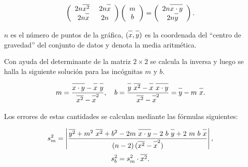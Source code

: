 \documentclass[10pd,hyperref={colorlinks=true}]{beamer}
\begin{document}
\begin{frame}{}

$$
\left(\begin{array}{cc}
2n\overline{\mathstrut x^2}\ & 2n\overline{\mathstrut x} \\
2n\overline{\mathstrut x} & 2n
\end{array}\right)
\left(\begin{array}{c}
m \\
b
\end{array}\right) =
\left(\begin{array}{c}
2n\overline{\mathstrut x\cdot y} \\
2n\overline{\mathstrut y}
\end{array}\right).
$$

$n$ es el n\'umero de puntos de la gr\'afica, $(\overline{\mathstrut 
x},\overline{\mathstrut y})$ es la coordenada del ``centro de gravedad'' 
del conjunto de datos y \raisebox{1.5ex}{\_} denota la media 
aritm\'etica.

Con ayuda del determinante de la matriz $2\times2$ se calcula la inversa 
y luego se halla la siguiente soluci\'on para las inc\'ognitas $m$ y 
$b$.

$$
m = {{\overline{\mathstrut x\cdot y}- \overline{\mathstrut x}\ 
\overline{\mathstrut y}}\over {\overline{\mathstrut x^2}- 
\overline{\mathstrut x}^2}},\quad
b = {{\overline{\mathstrut y}\ \overline{\mathstrut x^2} - 
\overline{\mathstrut x}\ \overline{\mathstrut x\cdot y}}\over 
{\overline{\mathstrut x^2}- \overline{\mathstrut x}^2}}
= \overline{\mathstrut y}-m\ \overline{\mathstrut x}.
$$

Los errores de estas cantidades se calculan mediante las f\'ormulas 
siguientes:

$$
s_m^2 =\left\vert {{\overline{\mathstrut y^2}+m^2\ \overline{\mathstrut 
x^2}+b^2- 2 m\ \overline{\mathstrut x\cdot y}-2\ b\ \overline{\mathstrut 
y}+2\ m\ b\ \overline{\mathstrut x}}\over {(n-2)\,(\overline{\mathstrut 
x^2}- \overline{\mathstrut x}^2)}}\right\vert,
$$
$$
s_b^2 =s_m^2\cdot \overline{\mathstrut x^2}.
$$

 \end{frame}

\end{document}
